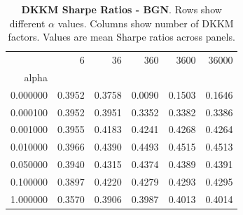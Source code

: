 \begin{table}[h]
\centering
\begin{tabular}{rrrrrr}
\toprule
 & 6 & 36 & 360 & 3600 & 36000 \\
alpha &  &  &  &  &  \\
\midrule
0.000000 & 0.3952 & 0.3758 & 0.0090 & 0.1503 & 0.1646 \\
0.000100 & 0.3952 & 0.3951 & 0.3352 & 0.3382 & 0.3386 \\
0.001000 & 0.3955 & 0.4183 & 0.4241 & 0.4268 & 0.4264 \\
0.010000 & 0.3966 & 0.4390 & 0.4493 & 0.4515 & 0.4513 \\
0.050000 & 0.3940 & 0.4315 & 0.4374 & 0.4389 & 0.4391 \\
0.100000 & 0.3897 & 0.4220 & 0.4279 & 0.4293 & 0.4295 \\
1.000000 & 0.3570 & 0.3906 & 0.3987 & 0.4013 & 0.4014 \\
\bottomrule
\end{tabular}
\caption{\textbf{DKKM Sharpe Ratios - BGN}.
    Rows show different $\alpha$ values. Columns show number of DKKM factors.
    Values are mean Sharpe ratios across panels.}
\label{tab:dkkm_sharpe_bgn}

\end{table}